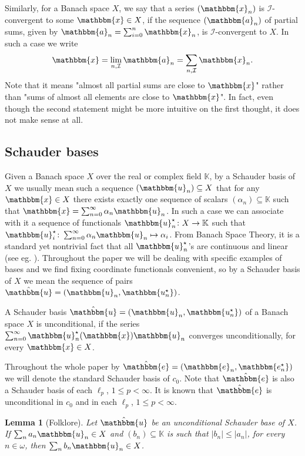 \documentclass[10pt,a4paper]{amsart}
\newcommand{\IK}{\mathbb{K}}
\newcommand{\I}{\mathcal{I}}
\newcommand{\w}{\mathbbm}
\newtheorem{lemma}[theorem]{Lemma}
\begin{document}
Similarly, for a Banach space $X$, we say that a series $(\w{x}_n)$ is $\I$-convergent to some $\w{x}\in X$, if the sequence $(\w{a}_n)$ of partial sums, given by $\w{a}_n = \sum_{i=0}^n \w{x}_n$, is $\I$-convergent to $X$. In such a case we write 
\[
\w{x}=\lim_{n,\I} \w{a}_n = \sum_{n,\I} \w{x}_n.
\]
Note that it means "almost all partial sums are close to $\w{x}$" rather than "sums of almost all elements are close to $\w{x}$". In fact, even though the second statement might be more intuitive on the first thought, it does not make sense at all. 

\subsection{Schauder bases}

Given a Banach space $X$ over the real or complex field $\IK$, by a Schauder basis of $X$ we usually mean such a sequence $(\w{u}_n)\subseteq X$ that for any $\w{x}\in X$ there exists exactly one sequence of scalars $(\alpha_n)\subseteq \IK$ such that $\w{x}= \sum_{n=0}^{\infty} \alpha_n \w{u}_n$. In such a case we can associate with it a sequence of functionals $\w{u}_n^\star \colon X \to \IK $ such that $\w{u}_i^\star \colon \sum_{n=0}^{\infty} \alpha_n \w{u}_n \mapsto \alpha_i$. From Banach Space Theory, it is a standard yet nontrivial fact that all $\w{u}_n^\star$'s are continuous and linear (see eg. \cite[Theorem 1.1.3]{AK}). Throughout the paper we will be dealing with specific examples of bases and we find fixing coordinate functionals convenient, so by a Schauder basis of $X$ we mean the sequence of pairs $\hat{\w{u}}=(\w{u}_n,\w{u_n^\star})$.

A Schauder basis $\hat{\w{u}}=(\w{u}_n,\w{u_n^\star})$ of a Banach space $X$ is unconditional, if the series $\sum_{n=0}^{\infty} \w{u}_n^\star(\w{x}) \w{u}_n$ converges unconditionally, for every $\w{x}\in X$.

Throughout the whole paper by $\hat{\w{e}}=(\w{e}_n,\w{e_n^\star})$ we will denote the standard Schauder basis of $c_0$. Note that $\hat{\w{e}}$ is also a Schauder basis of each $\ell_p$, $1\leq p<\infty$. It is known that $\hat{\w{e}}$ is unconditional in $c_0$ and in each $\ell_p$, $1\leq p<\infty$.


\begin{lemma}[Folklore]
\label{lem-monotonicznosc}
Let $\hat{\w{u}}$ be an unconditional Schauder base of $X$. If $\sum_n a_n \w{u}_n\in X$ and $(b_n)\subseteq \IK$ is such that $|b_n|\leq |a_n|$, for every $n \in \omega$, then $\sum_n b_n \w{u}_n \in X$.
\end{lemma}
\end{document}
